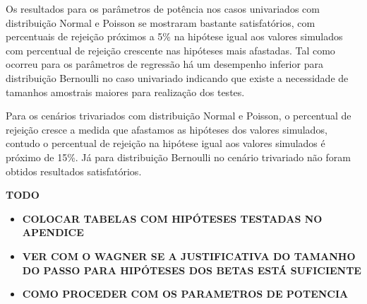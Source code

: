 Os resultados para os parâmetros de potência nos casos univariados com distribuição Normal e Poisson se mostraram bastante satisfatórios, com percentuais de rejeição próximos a 5\% na hipótese igual aos valores simulados com percentual de rejeição crescente nas hipóteses mais afastadas. Tal como ocorreu para os parâmetros de regressão há um desempenho inferior para distribuição Bernoulli no caso univariado indicando que existe a necessidade de tamanhos amostrais maiores para realização dos testes.

Para os cenários trivariados com distribuição Normal e Poisson, o percentual de rejeição cresce a medida que afastamos as hipóteses dos valores simulados, contudo o percentual de rejeição na hipótese igual aos valores simulados é próximo de 15\%. Já para distribuição Bernoulli no cenário trivariado não foram obtidos resultados satisfatórios.


\textbf{TODO}

\begin{itemize}

  \item \textbf{COLOCAR TABELAS COM HIPÓTESES TESTADAS NO APENDICE}

  \item \textbf{VER COM O WAGNER SE A JUSTIFICATIVA DO TAMANHO DO PASSO PARA HIPÓTESES DOS BETAS ESTÁ SUFICIENTE}

  \item \textbf{COMO PROCEDER COM OS PARAMETROS DE POTENCIA}

\end{itemize}

